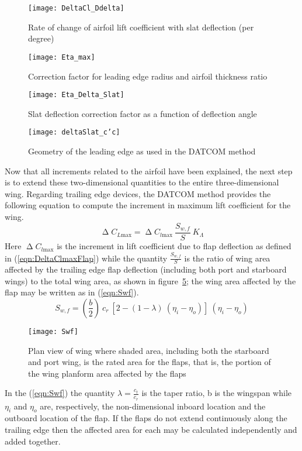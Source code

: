 %
\begin{figure}[H]
\centering
\texttt{[image: DeltaCl\_Ddelta]}
\caption{Rate of change of airfoil lift coefficient with slat deflection (per degree)}
\label{fig:dCldDelta}
\end{figure}
%
\begin{figure}[H]
\centering
\texttt{[image: Eta\_max]}
\caption{Correction factor for leading edge radius and airfoil thickness ratio}
\label{fig:etaDeltaMaxSlat}
\end{figure}
%
\begin{figure}[H]
\centering
\texttt{[image: Eta\_Delta\_Slat]}
\caption{Slat deflection correction factor as a function of deflection angle}
\label{fig:etaDeltaSlat}
\end{figure}
%
\begin{figure}[H]
\centering
\texttt{[image: deltaSlat\_c'c]}
\caption{Geometry of the leading edge as used in the \gls{DATCOM} method}
\label{fig:c'c_deltaSlat}
\end{figure}
%
\noindent
Now that all increments related to the airfoil have been explained, the next step is to extend these two-dimensional quantities to the entire three-dimensional wing.
Regarding trailing edge devices, the \gls{DATCOM} method provides the following equation to compute the increment in maximum lift coefficient for the wing.
%
\begin{equation}
\upDelta C_{L\text{max}}=\upDelta C_{l\text{max}}\ \dfrac{S_{w,f}}{S}\ K_\Lambda
\label{eqn:DeltaCLmaxFlap}
\end{equation}
%
\noindent
Here $\upDelta C_{l\text{max}}$ is the increment in lift coefficient due to flap deflection as defined in (\ref{eqn:DeltaClmaxFlap}) while the quantity $\frac{S_{w,f}}{S}$ is the ratio of wing area affected by the trailing edge flap deflection (including both port and starboard wings) to the total wing area, as shown in figure~\ref{fig:Swf}; the wing area affected by the flap may be written as in (\ref{eqn:Swf}).
%
\begin{equation}
S_{w,f}=\left(\dfrac{b}{2}\right)\ c_r\ \left[2-\left(1-\lambda\right)\ \left(\eta_i-\eta_o\right)\right]\ \left(\eta_i-\eta_o\right)
\label{eqn:Swf}
\end{equation}
%
\begin{figure}[!b]
\centering
\texttt{[image: Swf]}
\caption{Plan view of wing where shaded area, including both the starboard and port wing, is the rated area for the flaps, that is, the portion of the wing planform area affected by the flaps}
\label{fig:Swf}
\end{figure}
%
\noindent
In the (\ref{eqn:Swf}) the quantity $\lambda = \frac{c_t}{c_r}$ is the taper ratio, b is the wingspan while $\eta_i$ and $\eta_o$ are, respectively, the non-dimensional inboard location and the outboard location of the flap. If the flaps do not extend continuously along the trailing edge then the affected area for each may be calculated independently and added together.

